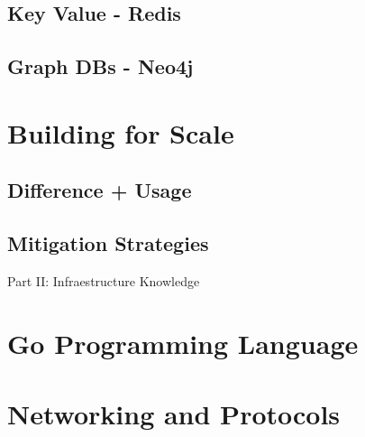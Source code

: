 \documentclass[a4paper]{article}
\begin{document}
    \subsection{Key Value - Redis}
    \subsection{Graph DBs - Neo4j}

    \newpage
    \section{Building for Scale}
    \subsection{Difference + Usage}
    \subsection{Mitigation Strategies}


    \newpage

    \thispagestyle{empty} %
    \vspace*{\fill}
    \begin{center}
        \Huge Part II: Infraestructure Knowledge
    \end{center}
    \vspace*{\fill}
    \newpage


    \section{Go Programming Language}
    \subsection{}
    \subsection{}

    \newpage
    \section{Networking and Protocols}
    \subsection{}
    \subsection{}
\end{document}
